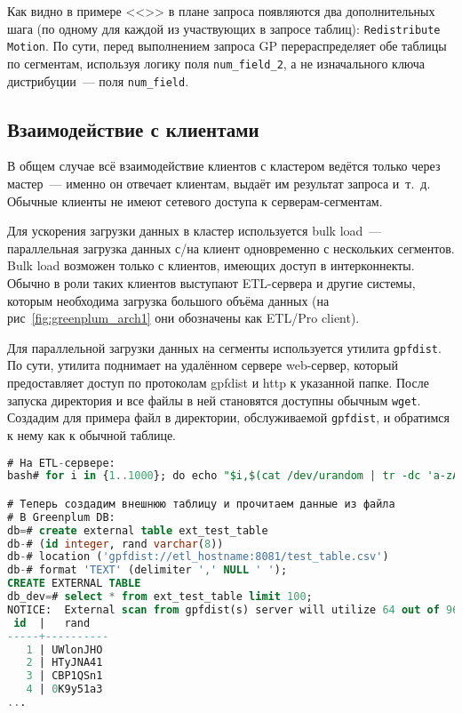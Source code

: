 Как видно в примере <<>> в плане запроса появляются два дополнительных шага (по одному для каждой из участвующих в запросе таблиц): \lstinline!Redistribute Motion!. По сути, перед выполнением запроса GP перераспределяет обе таблицы по сегментам, используя логику поля \lstinline!num_field_2!, а не изначального ключа дистрибуции~--- поля \lstinline!num_field!.


\subsection{Взаимодействие с клиентами}

В общем случае всё взаимодействие клиентов с кластером ведётся только через мастер~--- именно он отвечает клиентам, выдаёт им результат запроса и~т.~д. Обычные клиенты не имеют сетевого доступа к серверам-сегментам.

Для ускорения загрузки данных в кластер используется bulk load~--- параллельная загрузка данных с/на клиент одновременно с нескольких сегментов. Bulk load возможен только с клиентов, имеющих доступ в интерконнекты. Обычно в роли таких клиентов выступают ETL-сервера и другие системы, которым необходима загрузка большого объёма данных (на рис~\ref{fig:greenplum_arch1} они обозначены как ETL/Pro client).

Для параллельной загрузки данных на сегменты используется утилита \lstinline!gpfdist!. По сути, утилита поднимает на удалённом сервере web-сервер, который предоставляет доступ по протоколам gpfdist и http к указанной папке. После запуска директория и все файлы в ней становятся доступны обычным \lstinline!wget!. Создадим для примера файл в директории, обслуживаемой \lstinline!gpfdist!, и обратимся к нему как к обычной таблице.

\begin{lstlisting}[language=SQL,label=lst:greenplum_example4,caption=Пример с gpfdist]
# На ETL-сервере:
bash# for i in {1..1000}; do echo "$i,$(cat /dev/urandom | tr -dc 'a-zA-Z0-9' | fold -w 8 | head -n 1)"; done > /tmp/work/gpfdist_home/test_table.csv

# Теперь создадим внешнюю таблицу и прочитаем данные из файла
# В Greenplum DB:
db=# create external table ext_test_table
db-# (id integer, rand varchar(8))
db-# location ('gpfdist://etl_hostname:8081/test_table.csv')
db-# format 'TEXT' (delimiter ',' NULL ' ');
CREATE EXTERNAL TABLE
db_dev=# select * from ext_test_table limit 100;
NOTICE:  External scan from gpfdist(s) server will utilize 64 out of 96 segment databases
 id  |   rand
-----+----------
   1 | UWlonJHO
   2 | HTyJNA41
   3 | CBP1QSn1
   4 | 0K9y51a3
...
\end{lstlisting}

